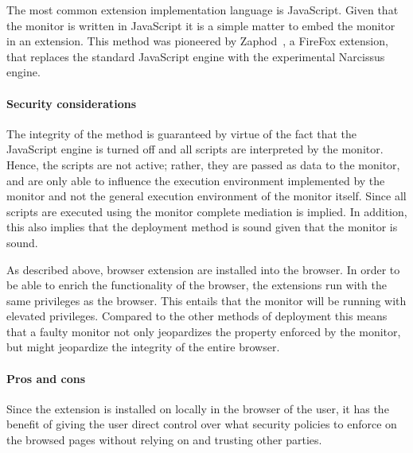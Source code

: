 \documentclass{llncs}
\begin{document}
The most common extension implementation language is JavaScript. Given that
the monitor is written in JavaScript it is a simple matter to embed the 
monitor in an extension.
This method was pioneered by Zaphod~\cite{Zaphod}, a
FireFox extension, that replaces the standard JavaScript engine with the
experimental Narcissus~\cite{Narcissus} engine.


\paragraph{Security considerations}

The integrity of the method is guaranteed by virtue of the fact that the
JavaScript engine is turned off and all scripts are interpreted by the monitor.
Hence, the scripts are not active; rather, they are passed as data to the
monitor, and are only able to influence the execution environment implemented
by the monitor and not the general execution environment of the monitor itself.
Since all scripts are executed using the monitor complete mediation is implied.
In addition, this also implies that the deployment method is sound given that
the monitor is sound. 

As described above, browser extension are installed into the browser. In order
to be able to enrich the functionality of the browser, the extensions run with
the same privileges as the browser. This entails that the monitor will be
running with elevated privileges. Compared to the other methods of deployment
this means that a faulty monitor not only jeopardizes the property enforced by
the monitor, but might jeopardize the integrity of the entire browser.

\paragraph{Pros and cons}

Since the extension is installed on locally in the browser of the user, it has
the benefit of giving the user direct control over what security policies to 
enforce on the browsed pages without relying on and trusting other parties.
\end{document}
